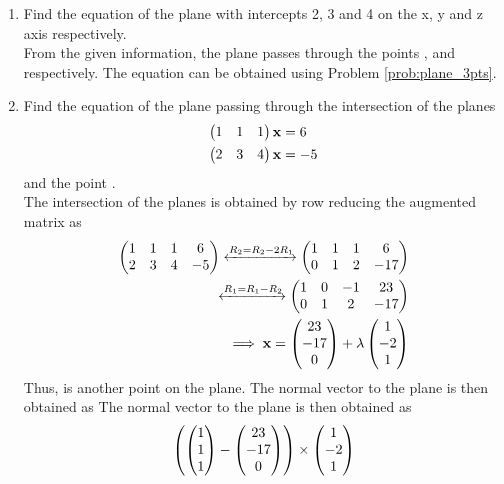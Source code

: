 \documentclass[journal,12pt,twocolumn]{IEEEtran}
\renewcommand\thesection{\arabic{section}}
\begin{document}
\begin{enumerate}[label=\thesection.\arabic*.,ref=\thesection.\theenumi]
\item Find the equation of the plane with intercepts 2, 3 and 4 on the x, y and z axis respectively.
\\
\solution From the given information, the plane passes through the points ,  and  respectively. The equation can be obtained using Problem \ref{prob:plane_3pts}.

\item Find the equation of the plane passing through the intersection of the planes 
%
\begin{align}
\label{eq:plane_2p_1pt_1}
\begin{pmatrix}1 & 1 & 1\end{pmatrix}\mathbf{x}&=6  
\\
\begin{pmatrix}2 & 3 & 4\end{pmatrix}\mathbf{x}&=-5
\label{eq:plane_2p_1pt_2}
\end{align}
%
and the point .
\\
\solution The intersection of the planes is obtained by row reducing the augmented matrix as
%
\begin{align}
\begin{pmatrix}
1 & 1 & 1 & 6
\\
2 & 3 & 4 & -5
\end{pmatrix}
\xleftrightarrow[]{R_2 = R_2 -2R_1}
\begin{pmatrix}
1 & 1 & 1 & 6
\\
0 & 1 & 2 & -17
\end{pmatrix}
\\
\xleftrightarrow[]{R_1 = R_1 -R_2}
\begin{pmatrix}
1 & 0 & -1 & 23
\\
0 & 1 & 2 & -17
\end{pmatrix}
\\
\implies 
\mathbf{x} = \begin{pmatrix}23\\-17\\0\end{pmatrix}+\lambda\begin{pmatrix}1\\-2\\1\end{pmatrix}
\end{align}
%
Thus,  is another point on the plane.  The normal vector to the plane is then obtained as
The normal vector to the plane is then obtained as
%
\begin{align}
\brak{ \myvec{1\\1\\1}-\myvec{23\\-17\\0}}\times \myvec{1\\-2\\1} 

\end{align}
\end{enumerate}
\end{document}
